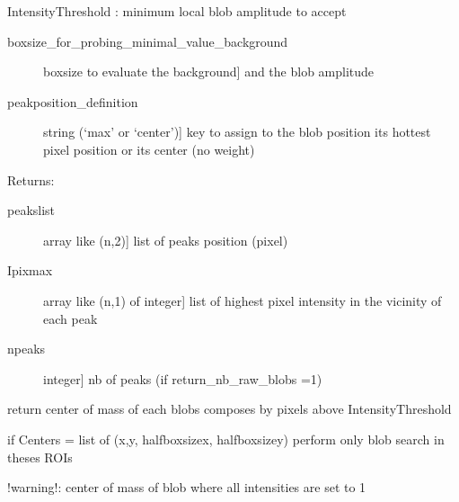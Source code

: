 \documentclass[letterpaper,10pt,english]{sphinxmanual}
\begin{document}
\begin{fulllineitems}
\begin{description}
\begin{description}
\begin{itemize}
\end{itemize}

\end{description}

\end{description}

IntensityThreshold : minimum local blob amplitude to accept
\begin{description}
\item[{boxsize\_for\_probing\_minimal\_value\_background}] \leavevmode{[}boxsize to evaluate the background{]}
and the blob amplitude

\item[{peakposition\_definition}] \leavevmode{[}string (‘max’ or ‘center’){]}
key to assign to the blob position its hottest pixel position
or its center (no weight)

\end{description}

Returns:
\textendash{}
\begin{description}
\item[{peakslist}] \leavevmode{[}array like (n,2){]}
list of peaks position (pixel)

\item[{Ipixmax}] \leavevmode{[}array like (n,1) of integer{]}
list of highest pixel intensity in the vicinity of each peak

\item[{npeaks}] \leavevmode{[}integer{]}
nb of peaks (if return\_nb\_raw\_blobs =1)

\end{description}

\end{fulllineitems}


\begin{fulllineitems}
\label{\detokenize{PeakSearch:LaueTools.readmccd.LocalMaxima_from_thresholdarray}}
return center of mass of each blobs composes by pixels above IntensityThreshold

if Centers = list of (x,y, halfboxsizex, halfboxsizey)  perform only blob search in theses ROIs

!warning!: center of mass of blob where all intensities are set to 1

\end{fulllineitems}
\end{document}
